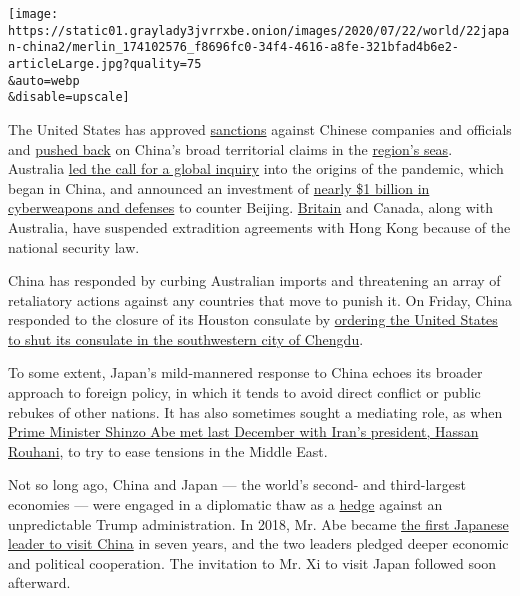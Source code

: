 \texttt{[image: https://static01.graylady3jvrrxbe.onion/images/2020/07/22/world/22japan-china2/merlin\_174102576\_f8696fc0-34f4-4616-a8fe-321bfad4b6e2-articleLarge.jpg?quality=75\\\&auto=webp\\\&disable=upscale]}

The United States has approved
\href{https://www.nytimes3xbfgragh.onion/2020/06/29/business/economy/us-halts-high-tech-exports-hong-kong.html}{sanctions}
against Chinese companies and officials and
\href{https://www.nytimes3xbfgragh.onion/2020/07/13/world/asia/south-china-sea-pompeo.html}{pushed
back} on China's broad territorial claims in the
\href{https://www.nytimes3xbfgragh.onion/2020/06/26/international-home/china-military-india-taiwan.html?searchResultPosition=2}{region's
seas}. Australia
\href{https://www.nytimes3xbfgragh.onion/2020/05/11/world/australia/coronavirus-china-inquiry.html}{led
the call for a global inquiry} into the origins of the pandemic, which
began in China, and announced an investment of
\href{https://www.nytimes3xbfgragh.onion/2020/06/30/world/australia/cyber-defense-china-hacking.html}{nearly
\$1 billion in cyberweapons and defenses} to counter Beijing.
\href{https://www.nytimes3xbfgragh.onion/2020/07/20/world/asia/extradition-treaty-hong-kong.html}{Britain}
and Canada, along with Australia, have suspended extradition agreements
with Hong Kong because of the national security law.

China has responded by curbing Australian imports and threatening an
array of retaliatory actions against any countries that move to punish
it. On Friday, China responded to the closure of its Houston consulate
by
\href{https://www.nytimes3xbfgragh.onion/2020/07/24/world/asia/china-us-consulate-chengdu.html?action=click\&module=Top\%20Stories\&pgtype=Homepage}{ordering
the United States to shut its consulate in the southwestern city of
Chengdu}.

To some extent, Japan's mild-mannered response to China echoes its
broader approach to foreign policy, in which it tends to avoid direct
conflict or public rebukes of other nations. It has also sometimes
sought a mediating role, as when
\href{https://www.nytimes3xbfgragh.onion/2019/12/20/world/asia/japan-iran-rouhani-abe.html?searchResultPosition=1}{Prime
Minister Shinzo Abe met last December with Iran's president, Hassan
Rouhani}, to try to ease tensions in the Middle East.

Not so long ago, China and Japan --- the world's second- and
third-largest economies --- were engaged in a diplomatic thaw as a
\href{https://www.nytimes3xbfgragh.onion/2018/10/24/world/asia/china-japan-shinzo-abe.html?rref=collection\%2Fsectioncollection\%2Fasia\&action=click\&contentCollection=asia\&region=stream\&module=stream_unit\&version=latest\&contentPlacement=9\&pgtype=sectionfront}{hedge}
against an unpredictable Trump administration. In 2018, Mr. Abe became
\href{https://www.nytimes3xbfgragh.onion/2018/10/26/world/asia/shinzo-abe-china-japan.html?searchResultPosition=2}{the
first Japanese leader to visit China} in seven years, and the two
leaders pledged deeper economic and political cooperation. The
invitation to Mr. Xi to visit Japan followed soon afterward.

